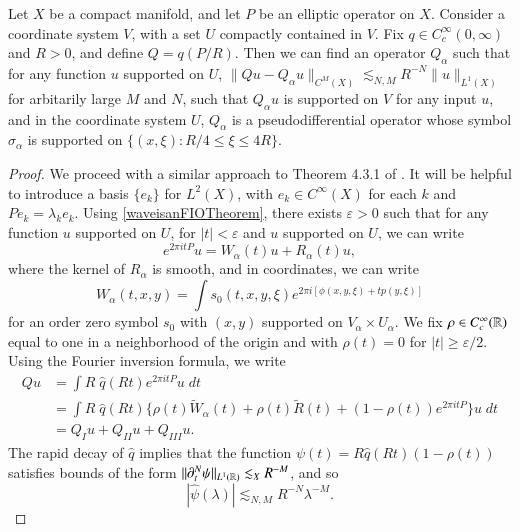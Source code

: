 \begin{theorem} \label{PseudoOsicllatoryLemma}
  Let $X$ be a compact manifold, and let $P$ be an elliptic operator on $X$. Consider a coordinate system $V$, with a set $U$ compactly contained in $V$. Fix $q \in C_c^\infty(0,\infty)$ and $R > 0$, and define $Q = q(P/R)$. Then we can find an operator $Q_\alpha$ such that for any function $u$ supported on $U$, $\| Qu - Q_\alpha u \|_{C^M(X)} \lesssim_{N,M} R^{-N} \| u \|_{L^1(X)}$ for arbitarily large $M$ and $N$, such that $Q_\alpha u$ is supported on $V$ for any input $u$, and in the coordinate system $U$, $Q_\alpha$ is a pseudodifferential operator whose symbol $\sigma_\alpha$ is supported on $\{ (x,\xi): R/4 \leq \xi \leq 4R \}$.
\end{theorem}
\begin{proof}
  We proceed with a similar approach to Theorem 4.3.1 of \cite{Sogge}. It will be helpful to introduce a basis $\{ e_k \}$ for $L^2(X)$, with $e_k \in C^\infty(X)$ for each $k$ and $Pe_k = \lambda_k e_k$. Using \ref{waveisanFIOTheorem}, there exists $\varepsilon > 0$ such that for any function $u$ supported on $U$, for $|t| < \varepsilon$ and $u$ supported on $U$, we can write
  \[ e^{2 \pi i t P} u = W_\alpha(t) u + R_\alpha(t) u, \]
  where the kernel of $R_\alpha$ is smooth, and in coordinates, we can write
  \[ W_\alpha(t,x,y) = \int s_0(t,x,y,\xi) e^{2 \pi i [ \phi(x,y,\xi) + t p(y,\xi) ]} \]
  for an order zero symbol $s_0$ with $(x,y)$ supported on $V_\alpha \times U_\alpha$. We fix $\rho \in C_c^\infty(\operatorname{\mathbb{R}})$ equal to one in a neighborhood of the origin and with $\rho(t) = 0$ for $|t| \geq \varepsilon / 2$. Using the Fourier inversion formula, we write
    \begin{equation}
    \begin{split}
        Qu &= \int R\;\! \widehat{q}(R t) e^{2 \pi i t P}u\; dt\\
        &= \int R\;\! \widehat{q}(Rt) \Big\{ \rho(t) \tilde{W}_\alpha(t) + \rho(t) \tilde{R}(t) + (1 - \rho(t)) e^{2 \pi i t P} \Big\} u\; dt\\
        &= Q_I u + Q_{II} u + Q_{III} u.
    \end{split}
    \end{equation}
    The rapid decay of $\widehat{q}$ implies that the function $\psi(t) = R \widehat{q}(Rt) (1 - \rho(t))$ satisfies bounds of the form $\| \partial_t^N \psi \|_{L^1(\operatorname{\mathbb{R}})} \lesssim_X R^{-M}$, and so
    \begin{equation} \label{psidecaybound}
        |\widehat{\psi}(\lambda)| \lesssim_{N,M} R^{-N} \lambda^{-M}.

\end{equation}
\end{proof}
